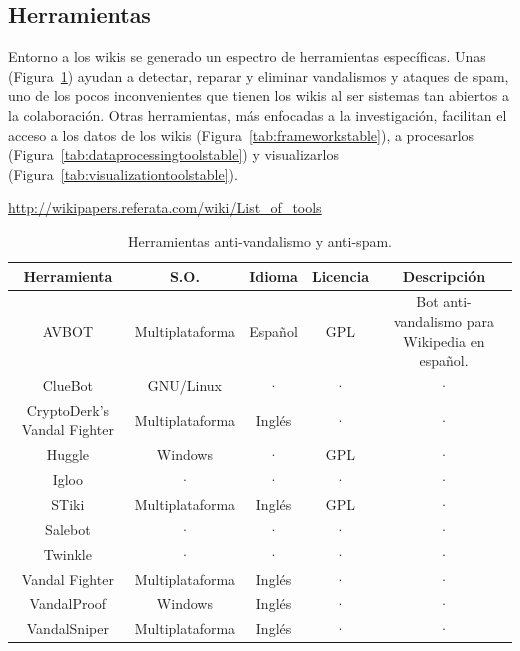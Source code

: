 \documentclass[11pt,onecolumn]{article}
\begin{document}
\subsection{Herramientas}


Entorno a los wikis se generado un espectro de herramientas específicas. Unas (Figura~\ref{tab:vandaltoolstable}) ayudan a detectar, reparar y eliminar vandalismos y ataques de spam, uno de los pocos inconvenientes que tienen los wikis al ser sistemas tan abiertos a la colaboración. Otras herramientas, más enfocadas a la investigación, facilitan el acceso a los datos de los wikis (Figura~\ref{tab:frameworkstable}), a procesarlos (Figura~\ref{tab:dataprocessingtoolstable}) y visualizarlos (Figura~\ref{tab:visualizationtoolstable}).

\href{http://wikipapers.referata.com/wiki/List_of_tools}{http://wikipapers.referata.com/wiki/List\_of\_tools}

\begin{table}
\centering
\begin{tabular}{| c | c | c | c | c |}
\hline
\textbf{Herramienta} & \textbf{S.O.} & \textbf{Idioma} & \textbf{Licencia} & \textbf{Descripción} \\
\hline
AVBOT & Multiplataforma & Español & GPL & Bot anti-vandalismo para Wikipedia en español. \\ \hline
ClueBot & GNU/Linux & · & · & · \\ \hline
CryptoDerk's Vandal Fighter & Multiplataforma & Inglés & · & · \\ \hline
Huggle & Windows & · & GPL & · \\ \hline
Igloo & · & · & · & · \\ \hline
STiki & Multiplataforma & Inglés & GPL & · \\ \hline
Salebot & · & · & · & · \\ \hline
Twinkle & · & · & · & · \\ \hline
Vandal Fighter & Multiplataforma & Inglés & · & · \\ \hline
VandalProof & Windows & Inglés & · & · \\ \hline
VandalSniper & Multiplataforma & Inglés & · & · \\ \hline
\end{tabular}
\caption{Herramientas anti-vandalismo y anti-spam.}
\label{tab:vandaltoolstable}
\end{table}
\end{document}

